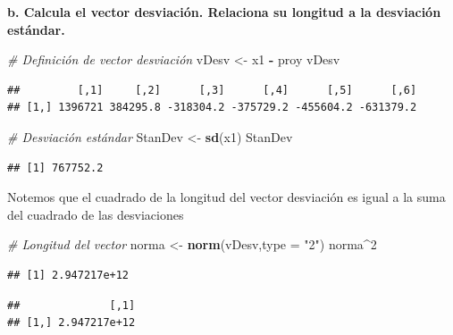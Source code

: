 \documentclass[
]{article}
\newenvironment{Shaded}{\begin{snugshade}}{\end{snugshade}}
\newcommand{\CommentTok}[1]{\textcolor[rgb]{0.56,0.35,0.01}{\textit{#1}}}
\newcommand{\DataTypeTok}[1]{\textcolor[rgb]{0.13,0.29,0.53}{#1}}
\newcommand{\DecValTok}[1]{\textcolor[rgb]{0.00,0.00,0.81}{#1}}
\newcommand{\KeywordTok}[1]{\textcolor[rgb]{0.13,0.29,0.53}{\textbf{#1}}}
\newcommand{\NormalTok}[1]{#1}
\newcommand{\OperatorTok}[1]{\textcolor[rgb]{0.81,0.36,0.00}{\textbf{#1}}}
\newcommand{\StringTok}[1]{\textcolor[rgb]{0.31,0.60,0.02}{#1}}
\begin{document}
\textbf{b. Calcula el vector desviación. Relaciona su longitud a la
desviación estándar.}

\begin{Shaded}
\begin{Highlighting}[]
  \CommentTok{# Definición de vector desviación}
\NormalTok{  vDesv <-}\StringTok{ }\NormalTok{x1 }\OperatorTok{-}\StringTok{ }\NormalTok{proy}
\NormalTok{  vDesv}
\end{Highlighting}
\end{Shaded}

\begin{verbatim}
##         [,1]     [,2]      [,3]      [,4]      [,5]      [,6]
## [1,] 1396721 384295.8 -318304.2 -375729.2 -455604.2 -631379.2
\end{verbatim}

\begin{Shaded}
\begin{Highlighting}[]
  \CommentTok{# Desviación estándar}
\NormalTok{  StanDev <-}\StringTok{ }\KeywordTok{sd}\NormalTok{(x1)}
\NormalTok{  StanDev}
\end{Highlighting}
\end{Shaded}

\begin{verbatim}
## [1] 767752.2
\end{verbatim}

Notemos que el cuadrado de la longitud del vector desviación es igual a
la suma del cuadrado de las desviaciones

\begin{Shaded}
\begin{Highlighting}[]
  \CommentTok{# Longitud del vector}
\NormalTok{  norma <-}\StringTok{ }\KeywordTok{norm}\NormalTok{(vDesv,}\DataTypeTok{type =} \StringTok{"2"}\NormalTok{)}
\NormalTok{  norma}\OperatorTok{^}\DecValTok{2}
\end{Highlighting}
\end{Shaded}

\begin{verbatim}
## [1] 2.947217e+12
\end{verbatim}

\begin{Shaded}
\end{Shaded}

\begin{verbatim}
##              [,1]
## [1,] 2.947217e+12
\end{verbatim}
\end{document}
